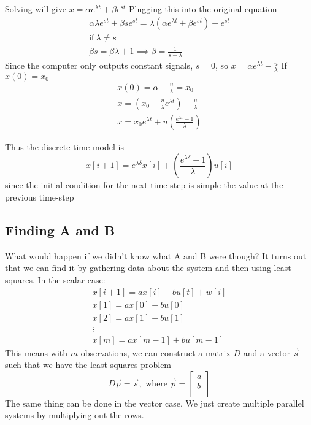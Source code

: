 \documentclass{article}
\begin{document}
Solving will give $x=\alpha e^{\lambda t}+\beta e^{st}$
Plugging this into the original equation
\[
    \begin{array}{c}
        \alpha \lambda e^{st}+\beta se^{st} = \lambda (\alpha e^{\lambda t}+\beta e^{st})+e^{st}\\
        \text{if}\> \lambda \ne s\\
        \beta s = \beta \lambda + 1 \implies \beta = \frac{1}{s-\lambda}
    \end{array}
    \]
Since the computer only outputs constant signals, $s=0$, so $x=\alpha e^{\lambda t}-\frac{u}{\lambda}$
If $x(0)=x_0$
\[
    \begin{array}{c}
        x(0)=\alpha - \frac{u}{\lambda}=x_0\\
        x = (x_0+\frac{u}{\lambda}e^{\lambda t})-\frac{u}{\lambda}\\
        x = x_0 e^{\lambda t}+u\left(
            \frac{e^{\lambda t}-1}{\lambda}
        \right)
    \end{array}
\]

Thus the discrete time model is
$$x[i+1]=e^{\lambda \delta}x[i]+\left(
    \frac{e^{\lambda \delta}-1}{\lambda}\right) u[i]$$
since the initial condition for the next time-step is simple the value at the previous time-step

\subsection{Finding A and B}
What would happen if we didn't know what A and B were though? It turns out that we can find it by gathering data about the system and then using least squares.
In the scalar case:
\[
    \begin{array}{c}
        x[i+1]=ax[i]+bu[t]+w[i]\\
        x[1]=ax[0]+bu[0]\\
        x[2]=ax[1]+bu[1]\\
        \vdots\\
        x[m]=ax[m-1]+bu[m-1]
    \end{array}
\]
This means with $m$ observations, we can construct a matrix $D$ and a vector $\vec{s}$ such that we have the least squares problem
\[
    D\vec{p}=\vec{s},\text{ where } \vec{p}=
\left[
    \begin{array}{c}
        a\\
        b\\
    \end{array}
\right]
\]
The same thing can be done in the vector case. We just create multiple parallel systems by multiplying out the rows.
\end{document}
